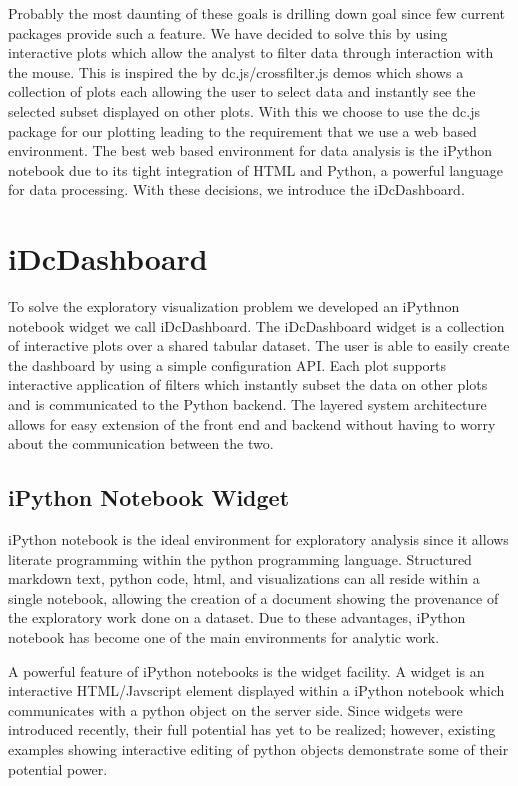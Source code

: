\documentclass[letter,twocolumn]{article}
\begin{document}
Probably the most daunting of these goals is drilling down goal since few current packages provide such a feature.
We have decided to solve this by using interactive plots which allow the analyst to filter data through interaction with the mouse.
This is inspired the by dc.js/crossfilter.js demos\cite{dcjs} which shows a collection of plots each allowing the user to select data and instantly see the selected subset displayed on other plots.
With this we choose to use the dc.js package for our plotting leading to the requirement that we use a web based environment.
The best web based environment for data analysis is the iPython notebook due to its tight integration of HTML and Python, a powerful language for data processing.
With these decisions, we introduce the iDcDashboard.

\section{iDcDashboard}%

To solve the exploratory visualization problem we developed an iPythnon notebook widget we call iDcDashboard.
The iDcDashboard widget is a collection of interactive plots over a shared tabular dataset.
The user is able to easily create the dashboard by using a simple configuration API.
Each plot supports interactive application of filters which instantly subset the data on other plots and is communicated to the Python backend.
The layered system architecture allows for easy extension of the front end and backend without having to worry about the communication between the two.

\subsection{iPython Notebook Widget}

iPython notebook\cite{perez2013open} is the ideal environment for exploratory analysis since it allows literate programming within the python programming language.
Structured markdown text, python code, html, and visualizations can all reside within a single notebook, allowing the creation of a document showing the provenance of the exploratory work done on a dataset. 
Due to these advantages, iPython notebook has become one of the main environments for analytic work.

A powerful feature of iPython notebooks is the widget facility.
A widget is an interactive HTML/Javscript element displayed within a iPython notebook which communicates with a python object on the server side.
Since widgets were introduced recently, their full potential has yet to be realized; however, existing examples showing interactive editing of python objects demonstrate some of their potential power.
\end{document}
